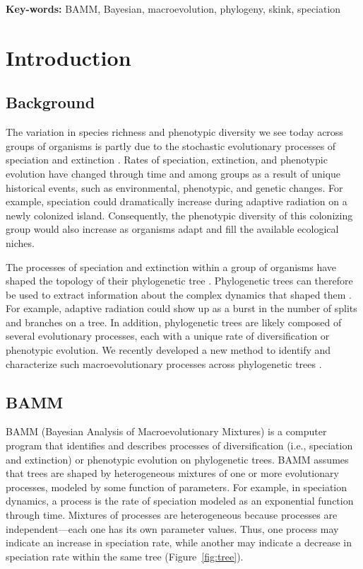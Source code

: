 \documentclass[12pt]{article}
\begin{document}
\begin{flushleft}
\textbf{Key-words:} BAMM, Bayesian, macroevolution, phylogeny, skink, speciation
\end{flushleft}


\pagebreak[4]


\section*{Introduction}

\subsection*{Background}

The variation in species richness and phenotypic diversity we see today
across groups of organisms is partly due to the stochastic
evolutionary processes of speciation and extinction \citep{rab14plos}.
%
Rates of speciation, extinction, and phenotypic evolution
have changed through time and among groups
as a result of unique historical events,
such as environmental, phenotypic, and genetic changes.
%
For example, speciation could dramatically increase
during adaptive radiation on a newly colonized island.
%
Consequently, the phenotypic diversity of this colonizing group
would also increase as organisms adapt and fill
the available ecological niches.


The processes of speciation and extinction within a group of organisms
have shaped the topology of their phylogenetic tree \citep{nee94}.
%
Phylogenetic trees can therefore be used to extract
information about the complex dynamics that shaped them \citep{rab14plos}.
%
For example, adaptive radiation could show up
as a burst in the number of splits and branches on a tree.
%
In addition,
phylogenetic trees are likely composed of several evolutionary processes,
each with a unique rate of diversification or phenotypic evolution.
%
We recently developed a new method to identify and characterize
such macroevolutionary processes across phylogenetic trees \citep{rab14plos}.


\subsection*{BAMM}

BAMM (Bayesian Analysis of Macroevolutionary Mixtures)
is a computer program that identifies and describes
processes of diversification (i.e., speciation and extinction)
or phenotypic evolution on phylogenetic trees.
%
BAMM assumes that trees are shaped by heterogeneous mixtures
of one or more evolutionary processes,
modeled by some function of parameters.
%
For example, in speciation dynamics,
a process is the rate of speciation
modeled as an exponential function through time.
%
Mixtures of processes are heterogeneous because processes
are independent---each one has its own parameter values.
%
Thus, one process may indicate an increase in speciation rate,
while another may indicate a decrease in speciation rate
within the same tree (Figure~\ref{fig:tree}).
\end{document}
